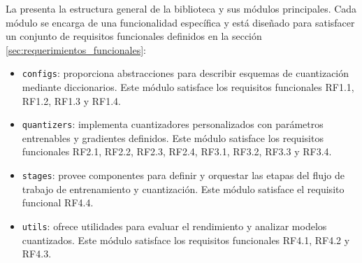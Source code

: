 La  presenta la estructura general de la biblioteca y sus módulos principales. Cada módulo se encarga de una funcionalidad específica y está diseñado para satisfacer un conjunto de requisitos funcionales definidos en la sección \ref{sec:requerimientos_funcionales}:


\begin{itemize}
  \item \texttt{configs}: proporciona abstracciones para describir esquemas de cuantización mediante diccionarios. Este módulo satisface los requisitos funcionales RF1.1, RF1.2, RF1.3 y RF1.4.
  \item \texttt{quantizers}: implementa cuantizadores personalizados con parámetros entrenables y gradientes definidos. Este módulo satisface los requisitos funcionales RF2.1, RF2.2, RF2.3, RF2.4, RF3.1, RF3.2, RF3.3 y RF3.4.
  \item \texttt{stages}: provee componentes para definir y orquestar las etapas del flujo de trabajo de entrenamiento y cuantización. Este módulo satisface el requisito funcional RF4.4.
  \item \texttt{utils}: ofrece utilidades para evaluar el rendimiento y analizar modelos cuantizados. Este módulo satisface los requisitos funcionales RF4.1, RF4.2 y RF4.3.
\end{itemize}






